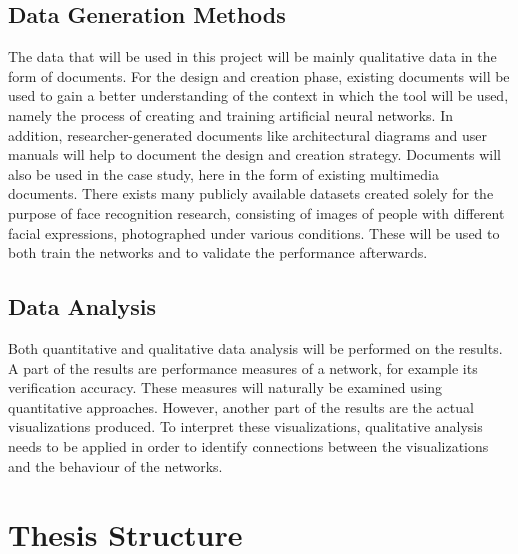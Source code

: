 \subsection{Data Generation Methods}

The data that will be used in this project will be mainly qualitative data in the form of documents. For the design and creation phase, existing documents will be used to gain a better understanding of the context in which the tool will be used, namely the process of creating and training artificial neural networks. In addition, researcher-generated documents like architectural diagrams and user manuals will help to document the design and creation strategy. Documents will also be used in the case study, here in the form of existing multimedia documents. There exists many publicly available datasets created solely for the purpose of face recognition research, consisting of images of people with different facial expressions, photographed under various conditions. These will be used to both train the networks and to validate the performance afterwards.

\subsection{Data Analysis}

Both quantitative and qualitative data analysis will be performed on the results. A part of the results are performance measures of a network, for example its verification accuracy. These measures will naturally be examined using quantitative approaches. However, another part of the results are the actual visualizations produced. To interpret these visualizations, qualitative analysis needs to be applied in order to identify connections between the visualizations and the behaviour of the networks.

\section{Thesis Structure}

